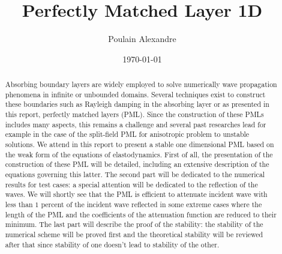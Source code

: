 \documentclass[11pt]{article}
\title{Perfectly Matched Layer 1D}
\author{Poulain Alexandre}
\date{\today}
\begin{document}
\pagestyle{empty}


\newpage
\renewcommand{\abstractname}{Abstract}
\begin{abstract}
Absorbing boundary layers are widely employed to solve numerically wave propagation phenomena in infinite or unbounded domains. Several techniques exist to construct these boundaries such as Rayleigh damping in the absorbing layer or as presented in this report, perfectly matched layers (PML).  
Since the construction of these PMLs includes many aspects, this remains a challenge and several past researches lead for example in the case of the split-field PML for anisotropic problem to unstable solutions.  We attend in this report to present a stable one dimensional PML based on the weak form of the equations of elastodynamics. 
First of all, the presentation of the construction of these PML will be detailed, including an extensive description of the equations governing this latter. The second part will be dedicated to the numerical results for test cases: a special attention will be dedicated to the reflection of the waves. We will shortly see that the PML is efficient to attenuate incident wave with less than $1$ percent of the incident wave reflected in some extreme cases where the length of the PML and the coefficients of the attenuation function are reduced to their minimum. The last part will describe the proof of the stability: the stability of the numerical scheme will be proved first and the theoretical stability will be reviewed after that since stability of one doesn't lead to stability of the other.    






\end{abstract}


\newpage

\tableofcontents

\newpage


\newpage


\newpage

\newpage

\newpage


\newpage



\newpage


\end{document}
